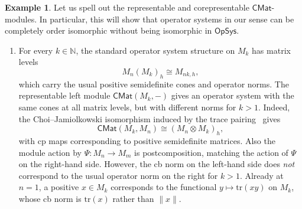 \documentclass[11pt,onecolumn]{article}
\newcommand{\N}{\mathbb{N}}
\newcommand{\OpSys}{\mathsf{OpSys}}
\theoremstyle{plain}
\theoremstyle{remark}
\theoremstyle{definition}
\newtheorem{example}[example]{Example}
\begin{document}
\begin{example}
	\label{ex:cmat_modules}
	Let us spell out the representable and corepresentable $\mathsf{CMat}$-modules.
	In particular, this will show that operator systems in our sense can be completely order isomorphic without being isomorphic in $\OpSys$.
	\begin{enumerate}
		\item
			For every $k \in \N$, the standard operator system structure on $M_k$ has matrix levels
			\[
				M_n(M_k)_h \cong M_{nk,h},
			\]
			which carry the usual positive semidefinite cones and operator norms.
			The representable left module $\mathsf{CMat}(M_k,-)$ gives an operator system with the same cones at all matrix levels, but with different norms for $k > 1$.
			Indeed, the Choi--Jamiolkowski isomorphism induced by the trace pairing~\cite[Theorem~3.14]{Paulsen} gives
			\[
				\mathsf{CMat}(M_k,M_n)
				\cong
				(M_n\otimes M_k)_h,
			\]
			with cp maps corresponding to positive semidefinite matrices.
			Also the module action by $\Psi \colon M_n \to M_m$ is postcomposition, matching the action of $\Psi$ on the right-hand side.
			However, the cb norm on the left-hand side does \emph{not} correspond to the usual operator norm on the right for $k > 1$.
			Already at $n = 1$, a positive $x \in M_k$ corresponds to the functional $y \mapsto \mathrm{tr}(xy)$ on $M_k$, whose cb norm is $\mathrm{tr}(x)$ rather than $\|x\|$.


\end{enumerate}
\end{example}
\end{document}
